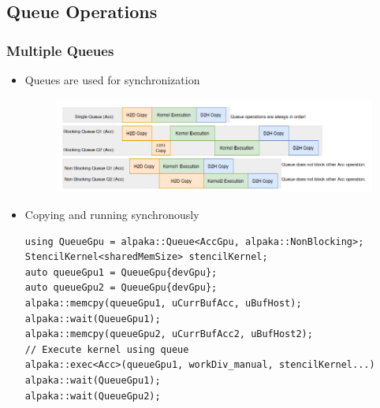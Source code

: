 \documentclass[9pt]{beamer}
\begin{document}
\subsection{Queue Operations}
\begin{frame}[fragile]
\frametitle{Multiple Queues}
\begin{itemize}
\item Queues are used for synchronization

\begin{figure}
    \centering
    \includegraphics[width=0.8\linewidth]{Screenshot from 2024-10-16 14-52-12.png}
    \label{fig:enter-label}
\end{figure}

\item Copying and running synchronously
\begin{lstlisting}
using QueueGpu = alpaka::Queue<AccGpu, alpaka::NonBlocking>;
StencilKernel<sharedMemSize> stencilKernel;
auto queueGpu1 = QueueGpu{devGpu};
auto queueGpu2 = QueueGpu{devGpu};
alpaka::memcpy(queueGpu1, uCurrBufAcc, uBufHost);
alpaka::wait(QueueGpu1);
alpaka::memcpy(queueGpu2, uCurrBufAcc2, uBufHost2);
// Execute kernel using queue
alpaka::exec<Acc>(queueGpu1, workDiv_manual, stencilKernel...)
alpaka::wait(QueueGpu1);
alpaka::wait(QueueGpu2);
\end{lstlisting}
\end{itemize}
\end{frame}
\end{document}
